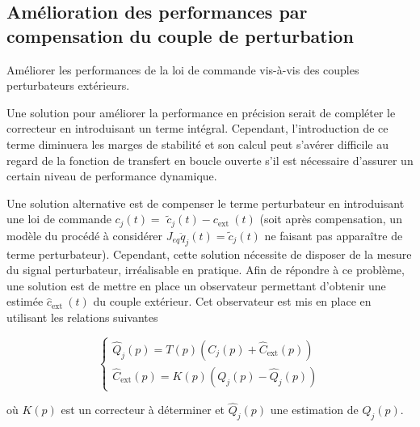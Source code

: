 
\subsection{Amélioration des performances par compensation du couple de perturbation}
\begin{obj}
Améliorer les performances de la loi de commande vis-à-vis des couples perturbateurs extérieurs.
\end{obj}

Une solution pour améliorer la performance en précision serait de compléter le correcteur en introduisant un terme intégral. Cependant, l'introduction de ce terme diminuera les marges de stabilité et son calcul peut s'avérer difficile au regard de la fonction de transfert en boucle ouverte s'il est nécessaire d'assurer un certain niveau de performance dynamique.

Une solution alternative est de compenser le terme perturbateur en introduisant une loi de commande $c_{j}(t)=$ $\tilde{c}_{j}(t)-c_{\text {ext }}(t)$ (soit après compensation, un modèle du procédé à considérer $J_{e q} \ddot{q}_{j}(t)=\tilde{c}_{j}(t)$ ne faisant pas apparaître de terme perturbateur). Cependant, cette solution nécessite de disposer de la mesure du signal perturbateur, irréalisable en pratique. Afin de répondre à ce problème, une solution est de mettre en place un observateur permettant d'obtenir une estimée $\hat{c}_{\text {ext }}(t)$ du couple extérieur. Cet observateur est mis en place en utilisant les relations suivantes

$$
\left\{\begin{array}{l}
\hat{Q}_{j}(p)=T(p)\left(C_{j}(p)+\hat{C}_{\mathrm{ext}}(p)\right) \\
\hat{C}_{\mathrm{ext}}(p)=K(p)\left(Q_{j}(p)-\hat{Q}_{j}(p)\right)
\end{array}\right.
$$

où $K(p)$ est un correcteur à déterminer et $\hat{Q}_{j}(p)$ une estimation de $Q_{j}(p)$.\\

